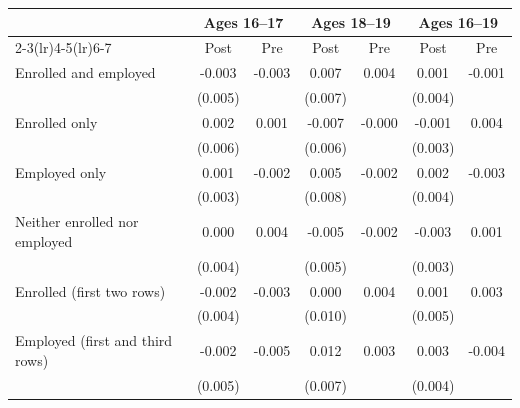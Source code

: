 \begin{tabular}{lcccccc}
\toprule
 & \multicolumn{2}{c}{Ages 16--17} & \multicolumn{2}{c}{Ages 18--19} & \multicolumn{2}{c}{Ages 16--19} \\
\cmidrule(lr){2-3}\cmidrule(lr){4-5}\cmidrule(lr){6-7}
 & Post & Pre & Post & Pre & Post & Pre \\
\midrule
Enrolled and employed & -0.003 & -0.003 & 0.007 & 0.004 & 0.001 & -0.001 \\
 & (0.005) &  & (0.007) &  & (0.004) &  \\
Enrolled only & 0.002 & 0.001 & -0.007 & -0.000 & -0.001 & 0.004 \\
 & (0.006) &  & (0.006) &  & (0.003) &  \\
Employed only & 0.001 & -0.002 & 0.005 & -0.002 & 0.002 & -0.003 \\
 & (0.003) &  & (0.008) &  & (0.004) &  \\
Neither enrolled nor employed & 0.000 & 0.004 & -0.005 & -0.002 & -0.003 & 0.001 \\
 & (0.004) &  & (0.005) &  & (0.003) &  \\
Enrolled (first two rows) & -0.002 & -0.003 & 0.000 & 0.004 & 0.001 & 0.003 \\
 & (0.004) &  & (0.010) &  & (0.005) &  \\
Employed (first and third rows) & -0.002 & -0.005 & 0.012 & 0.003 & 0.003 & -0.004 \\
 & (0.005) &  & (0.007) &  & (0.004) &  \\
\bottomrule
\end{tabular}
